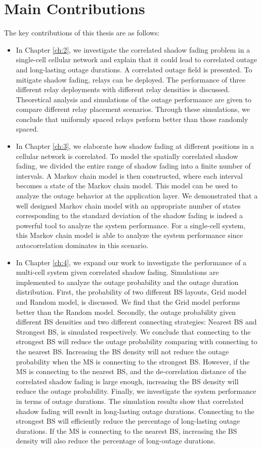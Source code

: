  \section{Main Contributions}
 \par The key contributions of this thesis are as follows:
 \begin{itemize}
 \item In Chapter \ref{ch:2}, we investigate the correlated shadow fading problem in a single-cell cellular network and explain that it could lead to correlated outage and long-lasting outage durations. A correlated outage field is presented. To mitigate shadow fading, relays can be deployed. The performance of three different relay deployments with different relay densities is discussed. Theoretical analysis and simulations of the outage performance are given to compare different relay placement scenarios. Through these simulations, we conclude that uniformly spaced relays perform better than those randomly spaced. \item In Chapter \ref{ch:3}, we elaborate how shadow fading at different positions in a cellular network is correlated. To model the spatially correlated shadow fading, we divided the entire range of shadow fading into a finite number of intervals. A Markov chain model is then constructed, where each interval becomes a state of the Markov chain model. This model can be used to analyze the outage behavior at the application layer. We demonstrated that a well designed Markov chain model with an appropriate number of states corresponding to the standard deviation of the shadow fading is indeed a powerful tool to analyze the system performance. For a single-cell system, this Markov chain model is able to analyze the system performance since autocorrelation dominates in this scenario. 
 \item In Chapter \ref{ch:4}, we expand our work to investigate the performance of a multi-cell system given correlated shadow fading. Simulations are implemented to analyze the outage probability and the outage duration distribution. First, the probability of two different BS layouts, Grid model and Random model, is discussed. We find that the Grid model performs better than the Random model. Secondly, the outage probability given different BS densities and two different connecting strategies: Nearest BS and Strongest BS, is simulated respectively. We conclude that connecting to the strongest BS will reduce the outage probability comparing with connecting to the nearest BS. Increasing the BS density will not reduce the outage probability when the MS is connecting to the strongest BS. However, if the MS is connecting to the nearest BS, and the de-correlation distance of the correlated shadow fading is large enough, increasing the BS density will reduce the outage probability. Finally, we investigate the system performance in terms of outage durations. The simulation results show that correlated shadow fading will result in long-lasting outage durations. Connecting to the strongest BS will efficiently reduce the percentage of long-lasting outage durations. If the MS is connecting to the nearest BS, increasing the BS density will also reduce the percentage of long-outage durations.

\end{itemize}
